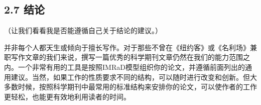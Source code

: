 \subsection*{2.7 结论}
（让我们看看我是否能遵循自己关于结论的建议。）

并非每个人都天生或倾向于擅长写作。对于那些不曾在《纽约客》或《名利场》兼职写作文章的我们来说，撰写一篇优秀的科学期刊文章仍然在我们的能力范围之内。一个非常有用的工具是按照IMRaD模型组织你的论文，并遵循前面列出的通用建议。当然，如果工作的性质要求不同的结构，可以随时进行改变和创新。但大多数时候，按照科学期刊中最常用的标准结构来安排你的论文，可以使作者的工作更轻松，也能更有效地利用读者的时间。

